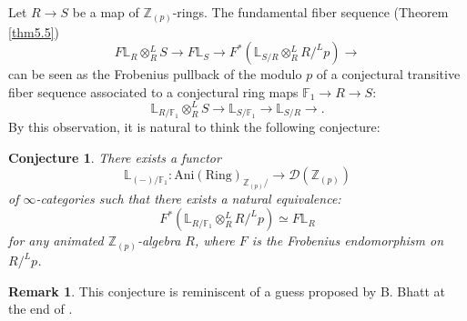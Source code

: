 \documentclass[11pt, a4paper]{amsart}
\theoremstyle{plain}
\newtheorem{conj}[theorem]{Conjecture}
\theoremstyle{definition}
\newtheorem{remark}[theorem]{Remark}
\begin{document}
Let $R\to S$ be a map of $\mathbb Z_{(p)}$-rings. The fundamental fiber sequence (Theorem \ref{thm5.5}) \[F\mathbb L_R\otimes_R^LS\to F\mathbb L_S\to F^*(\mathbb L_{S/R}\otimes_R^LR/^Lp)\to \] can be seen as the Frobenius pullback of the modulo $p$ of a conjectural transitive fiber sequence associated to a conjectural ring maps $\mathbb F_1\to R\to S$:\[\mathbb L_{R/\mathbb F_1}\otimes_R^LS\to \mathbb L_{S/{\mathbb F_1}}\to \mathbb L_{S/R}\to .\] By this observation, it is natural to think the following conjecture:
\begin{conj}
    There exists a functor\[\mathbb L_{(-)/\mathbb F_1}:\operatorname{Ani(Ring)}_{\mathbb Z_{(p)}/}\to \mathcal{D}(\mathbb Z_{(p)})\] of $\infty$-categories such that there exists a natural equivalence: \[F^*(\mathbb L_{R/\mathbb F_1}\otimes_R^LR/^Lp)\simeq F\mathbb L_{R}\] for any animated $\mathbb Z_{(p)}$-algebra $R$, where $F$ is the Frobenius endomorphism on $R/^Lp$.
\end{conj}
\begin{remark}
    This conjecture is reminiscent of a guess proposed by B. Bhatt at the end of \cite{Bha21}.
\end{remark}
\end{document}
